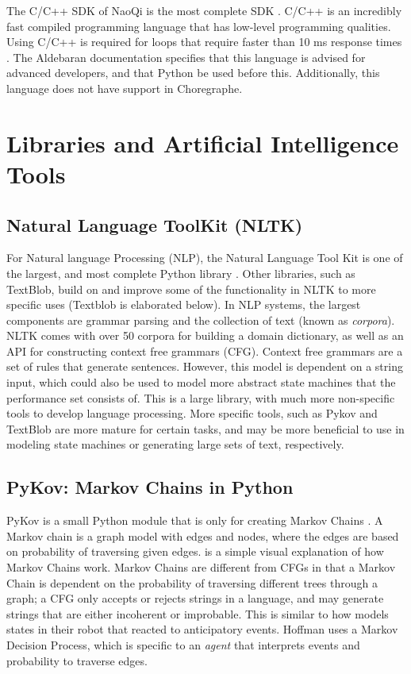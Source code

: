   The C/C++ SDK of NaoQi is the most complete SDK \cite{programmingLanguages}. C/C++ is an incredibly fast compiled programming language that has low-level programming qualities. Using C/C++ is required for loops that require faster than 10 ms response times \cite{programmingLanguages}. The Aldebaran documentation specifies that this language is advised for advanced developers, and that Python be used before this. Additionally, this language does not have support in Choregraphe.

\section{Libraries and Artificial Intelligence Tools}
  \subsection{Natural Language ToolKit (NLTK)}
    For Natural language Processing (NLP), the Natural Language Tool Kit is one of the largest, and most complete Python library \cite{nltk}. Other libraries, such as TextBlob, build on and improve some of the functionality in NLTK to more specific uses (Textblob is elaborated below). In NLP systems, the largest components are grammar parsing and the collection of text (known as \textit{corpora}). NLTK comes with over 50 corpora for building a domain dictionary, as well as an API for constructing context free grammars (CFG). Context free grammars are a set of rules that generate sentences. However, this model is dependent on a string input, which could also be used to model more abstract state machines that the performance set consists of. This is a large library, with much more non-specific tools to develop language processing. More specific tools, such as Pykov and TextBlob are more mature for certain tasks, and may be more beneficial to use in modeling state machines or generating large sets of text, respectively.

  \subsection{PyKov: Markov Chains in Python}
    PyKov is a small Python module that is only for creating Markov Chains \cite{pykov}. A Markov chain is a graph model with edges and nodes, where the edges are based on probability of traversing given edges. \cite{visualmarkov} is a simple visual explanation of how Markov Chains work. Markov Chains are different from CFGs in that a Markov Chain is dependent on the probability of traversing different trees through a graph; a CFG only accepts or rejects strings in a language, and may generate strings that are either incoherent or improbable. This is similar to how \cite{hoffman2010anticipation} models states in their robot that reacted to anticipatory events. Hoffman uses a Markov Decision Process, which is specific to an \textit{agent} that interprets events and probability to traverse edges.

